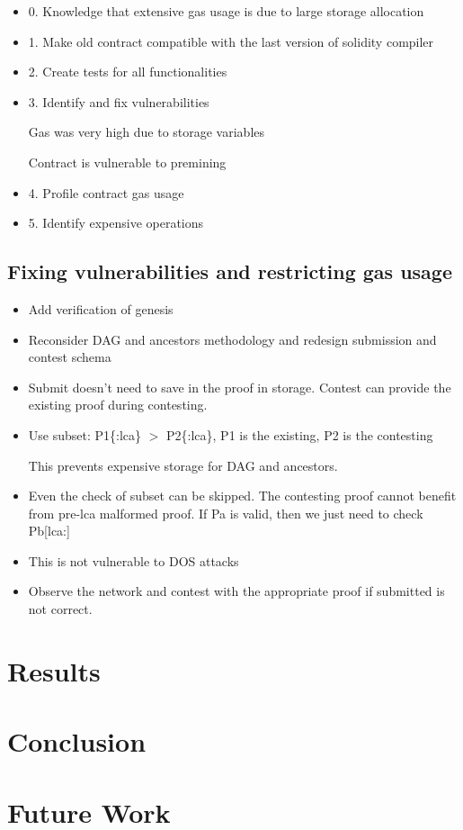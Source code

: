 \documentclass{article}
\begin{document}
  \begin{itemize}
  \item
    0. Knowledge that extensive gas usage is due to large storage
    allocation
  \item
    1. Make old contract compatible with the last version of solidity
    compiler
  \item
    2. Create tests for all functionalities
  \item
    3. Identify and fix vulnerabilities

    Gas was very high due to storage variables

    Contract is vulnerable to premining
  \item
    4. Profile contract gas usage
  \item
    5. Identify expensive operations
  \end{itemize}

  \subsection{Fixing vulnerabilities and restricting gas usage}

  \begin{itemize}

  \item
    Add verification of genesis
  \item
    Reconsider DAG and ancestors methodology and redesign submission and
    contest schema
  \item
    Submit doesn't need to save in the proof in storage. Contest can
    provide the existing proof during contesting.

  \item
    Use subset: P1\{:lca\} $>$ P2\{:lca\}, P1 is the existing, P2 is the
    contesting

    This prevents expensive storage for DAG and ancestors.

  \item
    Even the check of subset can be skipped. The contesting proof cannot
    benefit from pre-lca malformed proof. If Pa is valid, then we just
    need to check Pb[lca:]

  \item
    This is not vulnerable to DOS attacks

  \item
    Observe the network and contest with the appropriate proof if
    submitted is not correct.

  \end{itemize}

  \section{Results}

  \section{Conclusion}

  \section{Future Work}
\end{document}
